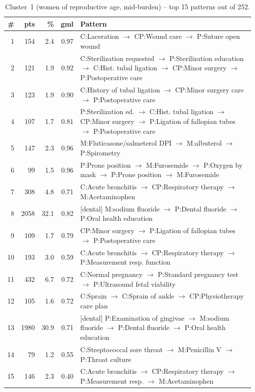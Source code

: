 \begin{table}[H]
\centering
\footnotesize
\setlength{\arraystretch}{1.05}
\begin{tabular}{@{}r r r r p{9.5cm}@{}}
\toprule
\# & pts & \% & gml & Pattern \\
\midrule
1  &  154 &  2.4 & 0.97 & C:Laceration $\to$ CP:Wound care $\to$ P:Suture open wound \\
2  &  121 &  1.9 & 0.92 & C:Sterilization requested $\to$ P:Sterilization education $\to$ C:Hist. tubal ligation $\to$ CP:Minor surgery $\to$ P:Postoperative care \\
3  &  123 &  1.9 & 0.90 & C:History of tubal ligation $\to$ CP:Minor surgery care $\to$ P:Postoperative care \\
4  &  107 &  1.7 & 0.81 & P:Sterilization ed. $\to$ C:Hist. tubal ligation $\to$ CP:Minor surgery $\to$ P:Ligation of fallopian tubes $\to$ P:Postoperative care \\
5  &  147 &  2.3 & 0.96 & M:Fluticasone/salmeterol DPI $\to$ M:albuterol $\to$ P:Spirometry \\
6  &   99 &  1.5 & 0.96 & P:Prone position $\to$ M:Furosemide $\to$ P:Oxygen by mask $\to$ P:Prone position $\to$ M:Furosemide \\
7  &  308 &  4.8 & 0.71 & C:Acute bronchitis $\to$ CP:Respiratory therapy $\to$ M:Acetaminophen \\
8  & 2058 & 32.1 & 0.82 & [dental] M:sodium fluoride $\to$ P:Dental fluoride $\to$ P:Oral health education \\
9  &  109 &  1.7 & 0.79 & CP:Minor surgery $\to$ P:Ligation of fallopian tubes $\to$ P:Postoperative care \\
10 &  193 &  3.0 & 0.59 & C:Acute bronchitis $\to$ CP:Respiratory therapy $\to$ P:Measurement resp. function \\
11 &  432 &  6.7 & 0.72 & C:Normal pregnancy $\to$ P:Standard pregnancy test $\to$ P:Ultrasound fetal viability \\
12 &  105 &  1.6 & 0.72 & C:Sprain $\to$ C:Sprain of ankle $\to$ CP:Physiotherapy care plan \\
13 & 1980 & 30.9 & 0.71 & [dental] P:Examination of gingivae $\to$ M:sodium fluoride $\to$ P:Dental fluoride $\to$ P:Oral health education \\
14 &   79 &  1.2 & 0.55 & C:Streptococcal sore throat $\to$ M:Penicillin V $\to$ P:Throat culture \\
15 &  146 &  2.3 & 0.40 & C:Acute bronchitis $\to$ CP:Respiratory therapy $\to$ P:Measurement resp. $\to$ M:Acetaminophen \\
\bottomrule
\end{tabular}
\caption{Cluster~1 (women of reproductive age, mid-burden) -- top 15 patterns out of 252.}
\label{tab:ch6_seq_c1}
\end{table}

